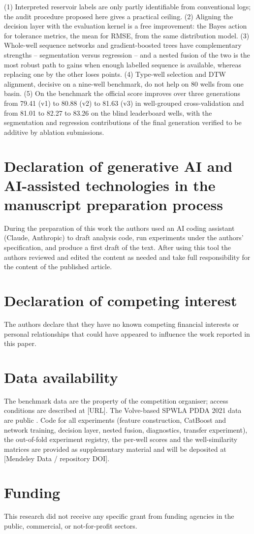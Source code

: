 \documentclass[preprint,12pt]{elsarticle}
\begin{document}
(1) Interpreted reservoir labels are only partly identifiable from conventional logs; the audit procedure proposed here gives a practical ceiling. (2) Aligning the decision layer with the evaluation kernel is a free improvement: the Bayes action for tolerance metrics, the mean for RMSE, from the same distribution model. (3) Whole-well sequence networks and gradient-boosted trees have complementary strengths -- segmentation versus regression -- and a nested fusion of the two is the most robust path to gains when enough labelled sequence is available, whereas replacing one by the other loses points. (4) Type-well selection and DTW alignment, decisive on a nine-well benchmark, do not help on 80 wells from one basin. (5) On the benchmark the official score improves over three generations from 79.41 (v1) to 80.88 (v2) to 81.63 (v3) in well-grouped cross-validation and from 81.01 to 82.27 to 83.26 on the blind leaderboard wells, with the segmentation and regression contributions of the final generation verified to be additive by ablation submissions.

\section*{Declaration of generative AI and AI-assisted technologies in the manuscript preparation process}
During the preparation of this work the authors used an AI coding assistant (Claude, Anthropic) to draft analysis code, run experiments under the authors' specification, and produce a first draft of the text. After using this tool the authors reviewed and edited the content as needed and take full responsibility for the content of the published article.

\section*{Declaration of competing interest}
The authors declare that they have no known competing financial interests or personal relationships that could have appeared to influence the work reported in this paper.

\section*{Data availability}
The benchmark data are the property of the competition organiser; access conditions are described at [URL]. The Volve-based SPWLA PDDA 2021 data are public \cite{pddasig2021}. Code for all experiments (feature construction, CatBoost and network training, decision layer, nested fusion, diagnostics, transfer experiment), the out-of-fold experiment registry, the per-well scores and the well-similarity matrices are provided as supplementary material and will be deposited at [Mendeley Data / repository DOI].

\section*{Funding}
This research did not receive any specific grant from funding agencies in the public, commercial, or not-for-profit sectors.



\end{document}
